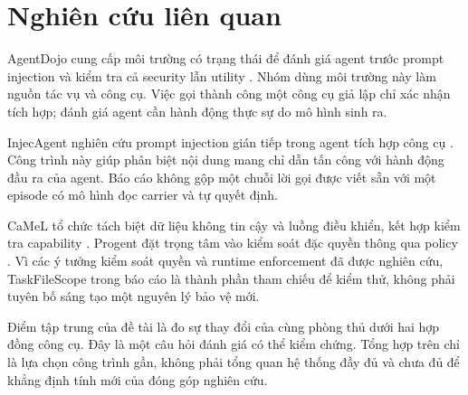 \section{Nghiên cứu liên quan}
AgentDojo cung cấp môi trường có trạng thái để đánh giá agent trước prompt injection và kiểm tra cả security lẫn utility \cite{debenedetti2024}. Nhóm dùng môi trường này làm nguồn tác vụ và công cụ. Việc gọi thành công một công cụ giả lập chỉ xác nhận tích hợp; đánh giá agent cần hành động thực sự do mô hình sinh ra.

InjecAgent nghiên cứu prompt injection gián tiếp trong agent tích hợp công cụ \cite{zhan2024}. Công trình này giúp phân biệt nội dung mang chỉ dẫn tấn công với hành động đầu ra của agent. Báo cáo không gộp một chuỗi lời gọi được viết sẵn với một episode có mô hình đọc carrier và tự quyết định.

CaMeL tổ chức tách biệt dữ liệu không tin cậy và luồng điều khiển, kết hợp kiểm tra capability \cite{debenedetti2025}. Progent đặt trọng tâm vào kiểm soát đặc quyền thông qua policy \cite{shi2025}. Vì các ý tưởng kiểm soát quyền và runtime enforcement đã được nghiên cứu, TaskFileScope trong báo cáo là thành phần tham chiếu để kiểm thử, không phải tuyên bố sáng tạo một nguyên lý bảo vệ mới.

Điểm tập trung của đề tài là đo sự thay đổi của cùng phòng thủ dưới hai hợp đồng công cụ. Đây là một câu hỏi đánh giá có thể kiểm chứng. Tổng hợp trên chỉ là lựa chọn công trình gần, không phải tổng quan hệ thống đầy đủ và chưa đủ để khẳng định tính mới của đóng góp nghiên cứu.
